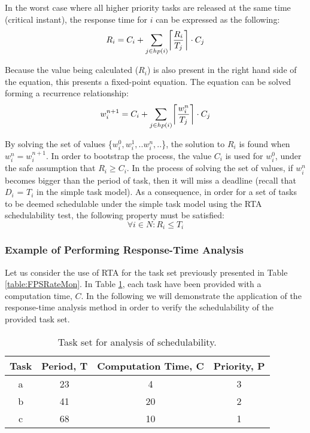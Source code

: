 In the worst case where all higher priority tasks are released at the same time (critical instant), the response time for $i$ can be expressed as the following:
\begin{equation}
	R_i = C_i + \sum_{j\in hp(i)} \ceil[\bigg]{\frac{R_i}{T_j}} \cdot C_j
\end{equation}

Because the value being calculated ($R_i$) is also present in the right hand side of the equation, this presents a fixed-point equation. The equation can be solved forming a recurrence relationship:
\begin{equation}
	\label{eq:recurrence}
	w^{n+1}_{i} = C_i + \sum_{j\in hp(i)} \ceil[\bigg]{\frac{w^n_i}{T_j}} \cdot C_j
\end{equation}

By solving the set of values \{$w^0_i, w^1_i, .. w^n_i, ..$\}, the solution to $R_i$ is found when $w^n_i = w^{n+1}_i$. In order to bootstrap the process, the value $C_i$ is used for $w^0_i$, under the safe assumption that $R_i \ge C_i$. In the process of solving the set of values, if $w^n_i$ becomes bigger than the period of task, then it will miss a deadline (recall that $D_i$ = $T_i$ in the simple task model). As a consequence, in order for a set of tasks to be deemed schedulable under the simple task model using the RTA schedulability test, the following property must be satisfied:
\begin{equation}
	\forall i \in N: R_i \le T_i
\end{equation}

\subsubsection{Example of Performing Response-Time Analysis}
Let us consider the use of RTA for the task set previously presented in Table \ref{table:FPSRateMon}. In Table \ref{table:FPSRateMonSecond}, each task have been provided with a computation time, $C$. In the following we will demonstrate the application of the response-time analysis method in order to verify the schedulability of the provided task set.
	\begin{table}
		\centering
		\begin{tabular}{c c c c}
		\hline
		Task & Period, T & Computation Time, C & Priority, P \\ [0.5ex]
		\hline 
		a & 23 & 4 &  3 \\
		b & 41 & 20 &  2 \\
		c & 68 & 10 &  1 \\ [1ex]
		\hline
		\end{tabular}
		\caption{Task set for analysis of schedulability.}
		\label{table:FPSRateMonSecond}
	\end{table}


